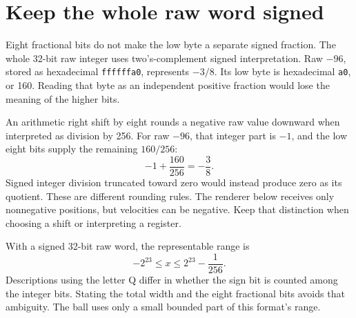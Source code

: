 \section{Keep the whole raw word signed}
Eight fractional bits do not make the low byte a separate signed fraction.
The whole 32-bit raw integer uses two's-complement signed interpretation. Raw
\(-96\), stored as hexadecimal \texttt{ffffffa0}, represents \(-3/8\).
Its low byte is hexadecimal \texttt{a0}, or 160. Reading that byte as an independent
positive fraction would lose the meaning of the higher bits.

An arithmetic right shift by eight rounds a negative raw value downward when
interpreted as division by 256. For raw \(-96\), that integer part is \(-1\),
and the low eight bits supply the remaining \(160/256\):
\[
  -1+\frac{160}{256}=-\frac{3}{8}.
\]
Signed integer division truncated toward zero would instead produce zero as its
quotient. These are different rounding rules. The renderer below receives only
nonnegative positions, but velocities can be negative. Keep that distinction when
choosing a shift or interpreting a register.

With a signed 32-bit raw word, the representable range is
\[
  -2^{23}\leq x\leq2^{23}-\frac1{256}.
\]
Descriptions using the letter Q differ in whether the sign bit is counted among
the integer bits. Stating the total width and the eight fractional bits avoids
that ambiguity. The ball uses only a small bounded part of this format's range.
